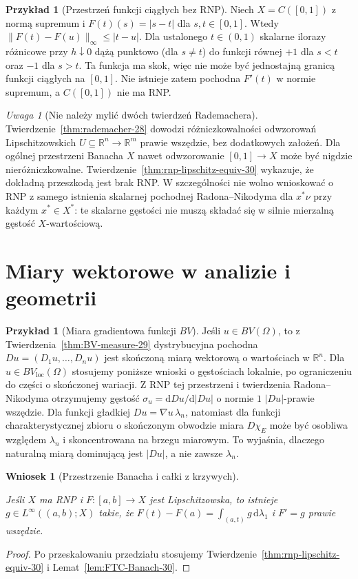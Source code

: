 \documentclass[11pt,a4paper,oneside]{book}
\numberwithin{equation}{chapter}
\theoremstyle{plain}
\newtheorem{wniosek}[twierdzenie]{Wniosek}
\theoremstyle{definition}
\newtheorem{przyklad}[twierdzenie]{Przykład}
\theoremstyle{remark}
\newtheorem{uwaga}[twierdzenie]{Uwaga}
\begin{document}
\begin{przyklad}[Przestrzeń funkcji ciągłych bez RNP]
Niech $X=C([0,1])$ z normą supremum i
$F(t)(s)=|s-t|$ dla $s,t\in[0,1]$.
Wtedy $\|F(t)-F(u)\|_\infty\le|t-u|$.
Dla ustalonego $t\in(0,1)$ skalarne ilorazy różnicowe
przy $h\downarrow0$ dążą punktowo (dla $s\ne t$)
do funkcji równej $+1$ dla $s<t$ oraz $-1$ dla $s>t$.
Ta funkcja ma skok, więc nie może być jednostajną
granicą funkcji ciągłych na $[0,1]$.
Nie istnieje zatem pochodna $F'(t)$ w normie supremum,
a $C([0,1])$ nie ma RNP.
\end{przyklad}

\begin{uwaga}[Nie należy mylić dwóch twierdzeń Rademachera]
Twierdzenie~\ref{thm:rademacher-28} dowodzi
różniczkowalności odwzorowań Lipschitzowskich
$U\subseteq\mathbb R^n\to\mathbb R^m$ prawie
wszędzie, bez dodatkowych założeń. Dla ogólnej
przestrzeni Banacha $X$ nawet odwzorowanie
$[0,1]\to X$ może być nigdzie nieróżniczkowalne.
Twierdzenie~\ref{thm:rnp-lipschitz-equiv-30}
wykazuje, że dokładną przeszkodą jest brak RNP.
W szczególności nie wolno wnioskować o RNP
z samego istnienia skalarnej pochodnej
Radona--Nikodyma dla $x^*\nu$ przy każdym
$x^*\in X^*$: te skalarne gęstości nie muszą
składać się w silnie mierzalną gęstość $X$-wartościową.
\end{uwaga}

\section{Miary wektorowe w analizie i geometrii}
\label{sec:vector-applications-30}
\begin{przyklad}[Miara gradientowa funkcji $BV$]
Jeśli $u\in BV(\Omega)$, to z
Twierdzenia~\ref{thm:BV-measure-29} dystrybucyjna
pochodna $Du=(D_1u,\ldots,D_nu)$ jest skończoną
miarą wektorową o wartościach w $\mathbb R^n$.
Dla $u\in BV_{\mathrm{loc}}(\Omega)$ stosujemy
poniższe wnioski o gęstościach lokalnie, po ograniczeniu
do części o skończonej wariacji.
Z RNP tej przestrzeni i twierdzenia
Radona--Nikodyma otrzymujemy gęstość
$\sigma_u=\mathrm dDu/\mathrm d|Du|$ o normie $1$
$|Du|$-prawie wszędzie. Dla funkcji gładkiej
$Du=\nabla u\,\lambda_n$, natomiast dla funkcji
charakterystycznej zbioru o skończonym obwodzie
miara $D\chi_E$ może być osobliwa względem
$\lambda_n$ i skoncentrowana na brzegu miarowym.
To wyjaśnia, dlaczego naturalną miarą dominującą
jest $|Du|$, a nie zawsze $\lambda_n$.
\end{przyklad}

\begin{wniosek}[Przestrzenie Banacha i całki z krzywych]\label{idx:30:wniosek:15}

Jeśli $X$ ma RNP i $F:[a,b]\to X$ jest
Lipschitzowska, to istnieje $g\in L^\infty((a,b);X)$
takie, że $F(t)-F(a)=\int_{(a,t)}g\,\mathrm d\lambda_1$
i $F'=g$ prawie wszędzie.
\end{wniosek}
\begin{proof}
Po przeskalowaniu przedziału stosujemy
Twierdzenie~\ref{thm:rnp-lipschitz-equiv-30} i
Lemat~\ref{lem:FTC-Banach-30}.
\end{proof}
\end{document}
